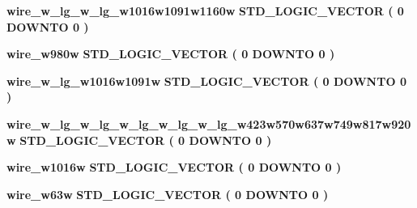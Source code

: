 \begin{DoxyCompactItemize}
\item 
{\bf wire\+\_\+w\+\_\+lg\+\_\+w\+\_\+lg\+\_\+w1016w1091w1160w} {\bfseries \textcolor{comment}{S\+T\+D\+\_\+\+L\+O\+G\+I\+C\+\_\+\+V\+E\+C\+T\+OR}\textcolor{vhdlchar}{ }\textcolor{vhdlchar}{(}\textcolor{vhdlchar}{ }\textcolor{vhdlchar}{ } \textcolor{vhdldigit}{0} \textcolor{vhdlchar}{ }\textcolor{keywordflow}{D\+O\+W\+N\+TO}\textcolor{vhdlchar}{ }\textcolor{vhdlchar}{ } \textcolor{vhdldigit}{0} \textcolor{vhdlchar}{ }\textcolor{vhdlchar}{)}\textcolor{vhdlchar}{ }} 
\item 
{\bf wire\+\_\+w980w} {\bfseries \textcolor{comment}{S\+T\+D\+\_\+\+L\+O\+G\+I\+C\+\_\+\+V\+E\+C\+T\+OR}\textcolor{vhdlchar}{ }\textcolor{vhdlchar}{(}\textcolor{vhdlchar}{ }\textcolor{vhdlchar}{ } \textcolor{vhdldigit}{0} \textcolor{vhdlchar}{ }\textcolor{keywordflow}{D\+O\+W\+N\+TO}\textcolor{vhdlchar}{ }\textcolor{vhdlchar}{ } \textcolor{vhdldigit}{0} \textcolor{vhdlchar}{ }\textcolor{vhdlchar}{)}\textcolor{vhdlchar}{ }} 
\item 
{\bf wire\+\_\+w\+\_\+lg\+\_\+w1016w1091w} {\bfseries \textcolor{comment}{S\+T\+D\+\_\+\+L\+O\+G\+I\+C\+\_\+\+V\+E\+C\+T\+OR}\textcolor{vhdlchar}{ }\textcolor{vhdlchar}{(}\textcolor{vhdlchar}{ }\textcolor{vhdlchar}{ } \textcolor{vhdldigit}{0} \textcolor{vhdlchar}{ }\textcolor{keywordflow}{D\+O\+W\+N\+TO}\textcolor{vhdlchar}{ }\textcolor{vhdlchar}{ } \textcolor{vhdldigit}{0} \textcolor{vhdlchar}{ }\textcolor{vhdlchar}{)}\textcolor{vhdlchar}{ }} 
\item 
{\bf wire\+\_\+w\+\_\+lg\+\_\+w\+\_\+lg\+\_\+w\+\_\+lg\+\_\+w\+\_\+lg\+\_\+w\+\_\+lg\+\_\+w423w570w637w749w817w920w} {\bfseries \textcolor{comment}{S\+T\+D\+\_\+\+L\+O\+G\+I\+C\+\_\+\+V\+E\+C\+T\+OR}\textcolor{vhdlchar}{ }\textcolor{vhdlchar}{(}\textcolor{vhdlchar}{ }\textcolor{vhdlchar}{ } \textcolor{vhdldigit}{0} \textcolor{vhdlchar}{ }\textcolor{keywordflow}{D\+O\+W\+N\+TO}\textcolor{vhdlchar}{ }\textcolor{vhdlchar}{ } \textcolor{vhdldigit}{0} \textcolor{vhdlchar}{ }\textcolor{vhdlchar}{)}\textcolor{vhdlchar}{ }} 
\item 
{\bf wire\+\_\+w1016w} {\bfseries \textcolor{comment}{S\+T\+D\+\_\+\+L\+O\+G\+I\+C\+\_\+\+V\+E\+C\+T\+OR}\textcolor{vhdlchar}{ }\textcolor{vhdlchar}{(}\textcolor{vhdlchar}{ }\textcolor{vhdlchar}{ } \textcolor{vhdldigit}{0} \textcolor{vhdlchar}{ }\textcolor{keywordflow}{D\+O\+W\+N\+TO}\textcolor{vhdlchar}{ }\textcolor{vhdlchar}{ } \textcolor{vhdldigit}{0} \textcolor{vhdlchar}{ }\textcolor{vhdlchar}{)}\textcolor{vhdlchar}{ }} 
\item 
{\bf wire\+\_\+w63w} {\bfseries \textcolor{comment}{S\+T\+D\+\_\+\+L\+O\+G\+I\+C\+\_\+\+V\+E\+C\+T\+OR}\textcolor{vhdlchar}{ }\textcolor{vhdlchar}{(}\textcolor{vhdlchar}{ }\textcolor{vhdlchar}{ } \textcolor{vhdldigit}{0} \textcolor{vhdlchar}{ }\textcolor{keywordflow}{D\+O\+W\+N\+TO}\textcolor{vhdlchar}{ }\textcolor{vhdlchar}{ } \textcolor{vhdldigit}{0} \textcolor{vhdlchar}{ }\textcolor{vhdlchar}{)}\textcolor{vhdlchar}{ }} 

\end{DoxyCompactItemize}
